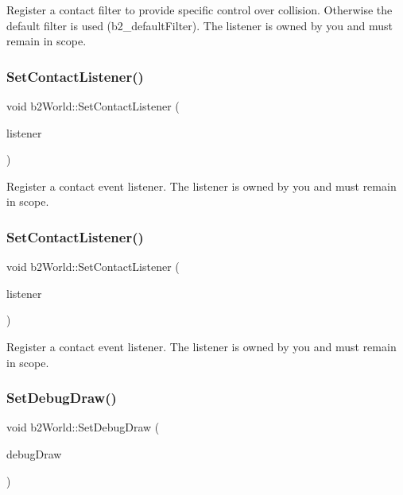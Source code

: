 Register a contact filter to provide specific control over collision. Otherwise the default filter is used (b2\+\_\+default\+Filter). The listener is owned by you and must remain in scope. \mbox{\label{classb2World_a614549967fb8a1584b61c11e2d553d42}} 
\subsubsection{\texorpdfstring{Set\+Contact\+Listener()}{SetContactListener()}\hspace{0.1cm}{\footnotesize\ttfamily [1/2]}}
{\footnotesize\ttfamily void b2\+World\+::\+Set\+Contact\+Listener (\begin{DoxyParamCaption}\item[{\hyperlink{classb2ContactListener}{b2\+Contact\+Listener} $\ast$}]{listener }\end{DoxyParamCaption})}

Register a contact event listener. The listener is owned by you and must remain in scope. \mbox{\label{classb2World_a614549967fb8a1584b61c11e2d553d42}} 
\subsubsection{\texorpdfstring{Set\+Contact\+Listener()}{SetContactListener()}\hspace{0.1cm}{\footnotesize\ttfamily [2/2]}}
{\footnotesize\ttfamily void b2\+World\+::\+Set\+Contact\+Listener (\begin{DoxyParamCaption}\item[{\hyperlink{classb2ContactListener}{b2\+Contact\+Listener} $\ast$}]{listener }\end{DoxyParamCaption})}

Register a contact event listener. The listener is owned by you and must remain in scope. \mbox{\label{classb2World_a6976d2c67400df03c0d44174ffcfb7ee}} 
\subsubsection{\texorpdfstring{Set\+Debug\+Draw()}{SetDebugDraw()}\hspace{0.1cm}{\footnotesize\ttfamily [1/2]}}
{\footnotesize\ttfamily void b2\+World\+::\+Set\+Debug\+Draw (\begin{DoxyParamCaption}\item[{\hyperlink{classb2Draw}{b2\+Draw} $\ast$}]{debug\+Draw }\end{DoxyParamCaption})}

